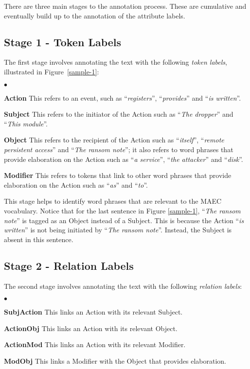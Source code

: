 \documentclass[11pt,a4paper]{article}
\newcommand{\squishlist}{
 \begin{list}{$\bullet$}
  { \setlength{\itemsep}{0pt}
     \setlength{\parsep}{3pt}
     \setlength{\topsep}{3pt}
     \setlength{\partopsep}{0pt}
     \setlength{\leftmargin}{1.5em}
     \setlength{\labelwidth}{1em}
     \setlength{\labelsep}{0.5em} } }
\newcommand{\squishend}{
  \end{list}  }
\begin{document}
There are three main stages to the annotation process. These are cumulative and eventually build up to the annotation of the attribute labels.


\subsection{Stage 1 - Token Labels}
\label{ann_stage1}

The first stage involves annotating the text with the following \emph{token labels}, illustrated in Figure~\ref{sample-1}:
\squishlist %
\item [\bf Action]		This refers to an event, such as ``\emph{registers}'', ``\emph{provides}'' and ``\emph{is written}''.
\item [\bf Subject]		This refers to the initiator of the Action such as ``\emph{The dropper}'' and ``\emph{This module}''.
\item [\bf Object]		This refers to the recipient of the Action such as ``\emph{itself}'', ``\emph{remote persistent access}'' and ``\emph{The ransom note}''; it also refers to word phrases that provide elaboration on the Action such as ``\emph{a service}'', ``\emph{the attacker}'' and ``\emph{disk}''.
\item [\bf Modifier]	This refers to tokens that link to other word phrases that provide elaboration on the Action such as ``\emph{as}'' and ``\emph{to}''.
\squishend %

This stage helps to identify word phrases that are relevant to the MAEC vocabulary. Notice that for the last sentence in Figure \ref{sample-1}, ``\emph{The ransom note}'' is tagged as an Object instead of a Subject. This is because the Action ``\emph{is written}'' is not being initiated by ``\emph{The ransom note}''. Instead, the Subject is absent in this sentence.

\subsection{Stage 2 - Relation Labels}

The second stage involves annotating the text with the following \emph{relation labels}:
\squishlist %
\item [\bf SubjAction]	This links an Action with its relevant Subject.
\item [\bf ActionObj]	This links an Action with its relevant Object.
\item [\bf ActionMod]	This links an Action with its relevant Modifier.
\item [\bf ModObj]		This links a Modifier with the Object that provides elaboration.
\squishend %
\end{document}
